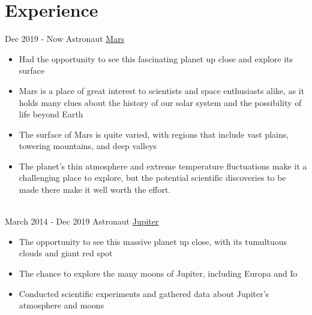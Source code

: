 
\section*{Experience}

\begin{twenty} %
	\twentyitem
	{Dec 2019 - }
	{Now}
	{Astronaut}
	{\href{https://en.wikipedia.org/wiki/Mars}{Mars}}
	{}
	{\begin{itemize}
			\item Had the opportunity to see this fascinating planet up close and explore its surface

			\item Mars is a place of great interest to scientists and space enthusiasts alike, as it holds many clues about the history of our solar system and the possibility of life beyond Earth

			\item The surface of Mars is quite varied, with regions that include vast plains, towering mountains, and deep valleys

			\item The planet's thin atmosphere and extreme temperature fluctuations make it a challenging place to explore, but the potential scientific discoveries to be made there make it well worth the effort.

		\end{itemize}}
	\\
	\twentyitem
	{March 2014 - }
	{Dec 2019}
	{Astronaut}
	{\href{https://en.wikipedia.org/wiki/Jupiter}{Jupiter}}
	{}
	{\begin{itemize}
			\item The opportunity to see this massive planet up close, with its tumultuous clouds and giant red spot
			\item The chance to explore the many moons of Jupiter, including Europa and Io
			\item Conducted scientific experiments and gathered data about Jupiter's atmosphere and moons
		\end{itemize}}
	\\


\end{twenty}
